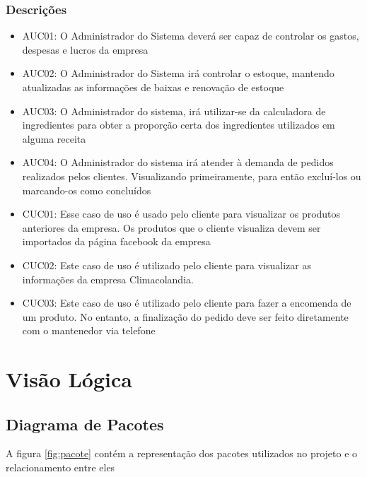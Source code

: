 \subsubsection{Descrições}

\begin{itemize}
	\item AUC01: O Administrador do Sistema deverá ser capaz de controlar os gastos, despesas e lucros da empresa
	\item AUC02: O Administrador do Sistema irá controlar o estoque, mantendo atualizadas as informações de baixas e renovação de estoque
	\item AUC03: O Administrador do sistema, irá utilizar-se da calculadora de ingredientes para obter a proporção certa dos ingredientes utilizados em alguma receita
	\item AUC04: O Administrador do sistema irá atender à demanda de pedidos realizados pelos clientes. Visualizando primeiramente, para então excluí-los ou marcando-os como concluídos
	\item CUC01: Esse caso de uso é usado pelo cliente para visualizar os produtos anteriores da empresa. Os produtos que o cliente visualiza devem ser importados da página facebook da empresa
	\item CUC02: Este caso de uso é utilizado pelo cliente para visualizar as informações da empresa Climacolandia. 
	\item CUC03: Este caso de uso é utilizado pelo cliente para fazer a encomenda de um produto. No entanto, a finalização do pedido deve ser feito diretamente com o mantenedor via telefone
\end{itemize}

\section{Visão Lógica}
\subsection{Diagrama de Pacotes}

A figura \ref{fig:pacote} contém a representação dos pacotes utilizados no projeto e o relacionamento entre eles

